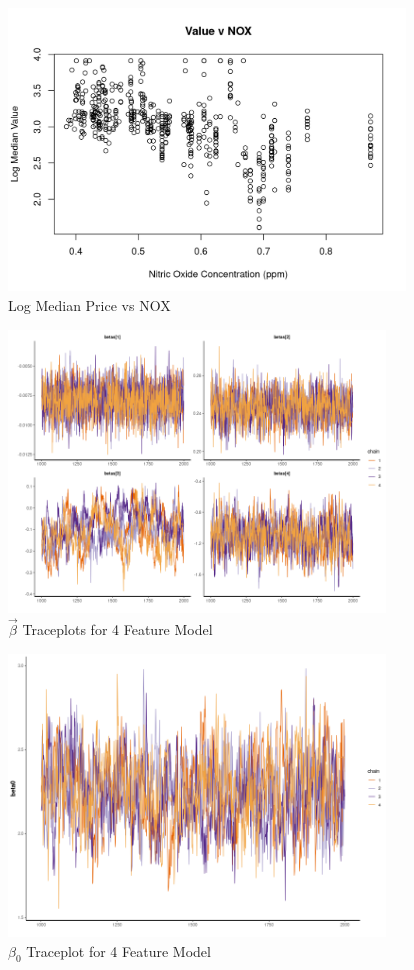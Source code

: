 \documentclass[11pt]{article}
\begin{document}
\begin{figure}[h!] 
	\centering
  \includegraphics[height=75mm]{nox.png}
  \caption{Log Median Price vs NOX}
  \label{fig:nox}
\end{figure}


\begin{figure}[h!] 
	\centering
  \includegraphics[height=75mm]{traceplot_betas.png}
  \caption{$\vec{\beta}$ Traceplots for 4 Feature Model}
  \label{fig:tbetas}
\end{figure}

\begin{figure}[h!] 
	\centering
  \includegraphics[height=75mm]{traceplot_beta0.png}
  \caption{$\beta_0$ Traceplot for 4 Feature Model}
  \label{fig:tbeta0}
\end{figure}
\end{document}
